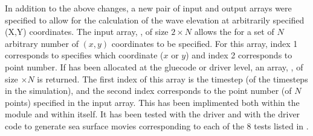 In addition to the above changes, a new pair of input and output arrays were specified to allow for the calculation of the wave elevation at arbitrarily specified (X,Y) coordinates.  The input array, , of size $2\times N$ allows the for a set of $N$ arbitrary number of $(x,y)$ coordinates to be specified.  For this array, index 1 corresponds to specifies which coordinate ($x$ or $y$) and index 2 corresponds to point number.  If  has been allocated at the gluecode or driver level, an array, , of size $\times N$ is returned.  The first index of this array is the timestep (of the  timesteps in the simulation), and the second index corresponds to the point number (of $N$ points) specified in the  input array.  This has been implimented both within the  module and within \HD itself.  It has been tested with the \HD driver and with the  driver code to generate sea surface movies corresponding to each of the 8 tests listed in .
